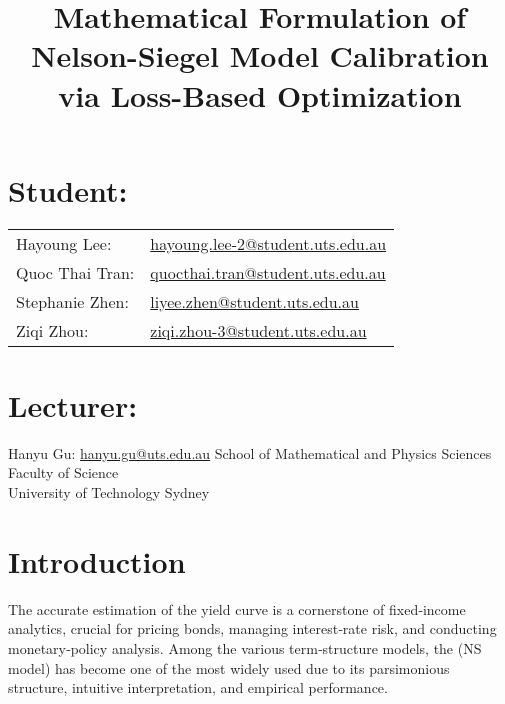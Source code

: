 \documentclass[12pt]{article}
\begin{document}
\title{Mathematical Formulation of Nelson-Siegel Model Calibration via Loss-Based Optimization}
\maketitle



\begin{center}
\section*{Student:}
\begin{tabular}{@{}ll@{}}
Hayoung Lee:   & \href{mailto:hayoung.lee-2@student.uts.edu.au}{hayoung.lee-2@student.uts.edu.au} \\ 
Quoc Thai Tran:& \href{mailto:quocthai.tran@student.uts.edu.au}{quocthai.tran@student.uts.edu.au} \\ 
Stephanie Zhen:& \href{mailto:liyee.zhen@student.uts.edu.au}{liyee.zhen@student.uts.edu.au}\\ 
Ziqi Zhou:     & \href{mailto:ziqi.zhou-3@student.uts.edu.au}{ziqi.zhou-3@student.uts.edu.au} 
\end{tabular}

\section*{Lecturer:}
Hanyu Gu: \href{mailto:hanyu.gu@uts.edu.au}{hanyu.gu@uts.edu.au}
\vfill
\large
School of Mathematical and Physics Sciences\\
Faculty of Science\\
University of Technology Sydney\\

\end{center}
\clearpage
\tableofcontents

\vspace{1cm}
\clearpage
\section{Introduction}

The accurate estimation of the yield curve is a cornerstone of fixed‑income analytics, crucial for pricing bonds, managing interest‑rate risk, and conducting monetary‑policy analysis. Among the various term‑structure models, the \cite{NelsonSiegel1987} (NS model) has become one of the most widely used due to its parsimonious structure, intuitive interpretation, and empirical performance.
\end{document}
